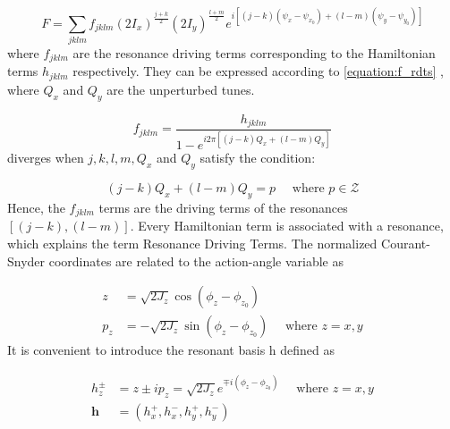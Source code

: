 \begin{equation}
    F = \sum_{j k l m} f_{j k l m} \left(2 I_{x}\right)^{\frac{j+k}{2}}\left(2 I_{y}\right)^{\frac{l+m}{2}} e^{i\left[(j-k)\left(\psi_{x}-\psi_{x_{0}}\right)+(l-m)\left(\psi_{y}-\psi_{y_{0}}\right)\right]}
    \label{equation:F_generating}
\end{equation}
where \(f_{jklm}\) are the resonance driving terms corresponding to the Hamiltonian terms \(h_{jklm}\) respectively.
They can be expressed according to \cref{equation:f_rdts} \cite{Tomas_thesis, Franchi_thesis}, where \(Q_x\) and \(Q_y\) are the unperturbed tunes.

\begin{equation}
    f_{jklm} = \frac{h_{jklm}}{1 - e^{i 2 \pi \left[(j-k) Q_{x} + (l-m) Q_{y} \right]}}
    \label{equation:f_rdts}
\end{equation}
 diverges when \(j, k, l, m, Q_x\) and \(Q_y\) satisfy the condition:

\begin{equation}
    (j-k) Q_{x} + (l-m) Q_{y} = p \quad \text{ where } p \in \mathcal{Z}
    \label{equation:resonance_condition}
\end{equation}
Hence, the \(f_{jklm}\) terms are the driving terms of the resonances \([(j-k),(l-m)]\).
Every Hamiltonian term is associated with a resonance, which explains the term Resonance Driving Terms.
The normalized Courant-Snyder coordinates are related to the action-angle variable as

\begin{equation}
    \begin{aligned}
    z &= \sqrt{2 J_{z}} \cos (\phi_{z} - \phi_{z_{0}}) \\
    p_{z} &= -\sqrt{2 J_{z}} \sin (\phi_{z} - \phi_{z_{0}}) \quad \text { where } z=x, y
    \end{aligned}
    \label{equation:courant_snyder_to_action_angle}
\end{equation}
It is convenient to introduce the resonant basis h defined as

\begin{equation}
    \begin{aligned}
    h_{z}^{\pm} &= z \pm i p_{z} = \sqrt{2 J_{z}} e^{\mp i \left(\phi_{z}-\phi_{z_{0}}\right)} \quad \text { where } z=x, y \\
    \mathbf{h} &= \left( h_{x}^{+}, h_{x}^{-}, h_{y}^{+}, h_{y}^{-} \right)
    \end{aligned}
    \label{equation:resonant_basis_h}
\end{equation}

